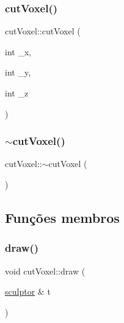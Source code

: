 \subsubsection{\texorpdfstring{cutVoxel()}{cutVoxel()}}
{\footnotesize\ttfamily cut\+Voxel\+::cut\+Voxel (\begin{DoxyParamCaption}\item[{int}]{\+\_\+x,  }\item[{int}]{\+\_\+y,  }\item[{int}]{\+\_\+z }\end{DoxyParamCaption})}


\begin{DoxyCode}{0}

\end{DoxyCode}
\mbox{\label{classcut_voxel_a7bcbee6a6842c7b359980f5d6fe29921}} 
\subsubsection{\texorpdfstring{$\sim$cutVoxel()}{~cutVoxel()}}
{\footnotesize\ttfamily cut\+Voxel\+::$\sim$cut\+Voxel (\begin{DoxyParamCaption}{ }\end{DoxyParamCaption})}


\begin{DoxyCode}{0}

\end{DoxyCode}


\subsection{Funções membros}
\mbox{\label{classcut_voxel_a5597800b2270f51a9526ba9b3f751101}} 
\subsubsection{\texorpdfstring{draw()}{draw()}}
{\footnotesize\ttfamily void cut\+Voxel\+::draw (\begin{DoxyParamCaption}\item[{\mbox{\hyperlink{classsculptor}{sculptor}} \&}]{t }\end{DoxyParamCaption})\hspace{0.3cm}{\ttfamily [virtual]}}



